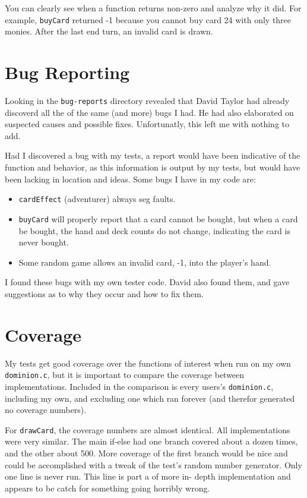 \documentclass[letterpaper,12pt]{article}
\begin{document}
You can clearly see when a function returns non-zero and analyze why it did.
For example, {\tt buyCard} returned -1 because you cannot buy card 24 with
only three monies. After the last end turn, an invalid card is drawn.

\section{Bug Reporting}
Looking in the {\tt bug-reports} directory revealed that David Taylor had
already discoverd all the of the same (and more) bugs I had. He had also
elaborated on suspected causes and possible fixes. Unfortunatly, this left me
with nothing to add.

Had I discovered a bug with my tests, a report would have been indicative of
the function and behavior, as this information is output by my tests, but would
have been lacking in location and ideas. Some bugs I have in my code are:

\begin{itemize}
	\item {\tt cardEffect} (adventurer) always seg faults.
	\item {\tt buyCard} will properly report that a card cannot be bought, but
	when a card be bought, the hand and deck counts do not change, indicating
	the card is never bought.
	\item Some random game allows an invalid card, -1, into the player's hand.
\end{itemize}

I found these bugs with my own tester code. David also found them, and gave
suggestions as to why they occur and how to fix them.

\section{Coverage}
My tests get good coverage over the functions of interest when run on my own
{\tt dominion.c}, but it is important to compare the coverage between
implementations. Included in the comparison is every users's {\tt dominion.c},
including my own, and excluding one which ran forever (and therefor generated
no coverage numbers).

For {\tt drawCard}, the coverage numbers are almost identical. All
implementations were very similar. The main if-else had one branch covered
about a dozen times, and the other about 500. More coverage of the first branch
would be nice and could be accomplished with a tweak of the test's random
number generator. Only one line is never run. This line is part a of more in-
depth implementation and appears to be catch for something going horribly
wrong.
\end{document}
